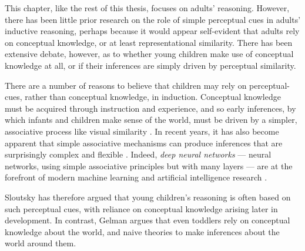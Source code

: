 This chapter, like the rest of this thesis, focuses on adults' reasoning.
However, there has been little prior research on the role of
simple perceptual cues in adults' inductive reasoning,
perhaps because it would appear self-evident that
adults rely on conceptual knowledge,
or at least representational similarity.
There has been extensive debate, however,
as to whether young children make use of conceptual knowledge at all,
or if their inferences are simply driven by perceptual similarity.

There are a number of reasons to believe that children may rely on perceptual-cues,
rather than conceptual knowledge, in induction.
Conceptual knowledge must be acquired through instruction and experience,
and so early inferences, by which infants and children make sense of the world,
must be driven by a simpler, associative process like visual similarity
\citep{Westermann2013,French2004}.
In recent years, it has also become apparent that
simple associative mechanisms can produce
inferences that are surprisingly complex and flexible \citep{Sloutsky2008,Hinton2014}.
Indeed, \emph{deep neural networks} ---
neural networks, using simple associative principles but with many layers ---
are at the forefront of modern machine learning and artificial intelligence research
\citep{Mnih2013,Hinton2006}.

Sloutsky \citep[i.e.][see \citealp{Sloutsky2003,Sloutsky2010} for reviews]{
  Sloutsky2008,Sloutsky2007,Sloutsky2004a}
has therefore argued that young children's reasoning
is often based on such perceptual cues,
with reliance on conceptual knowledge arising later in development.
In contrast, Gelman 
\citep[i.e.][see \citealp{Gelman2011a,Gelman2004a} for reviews]{
  Gelman2013c,Rhodes2009,Gelman2007a,Gelman1986}
argues that even toddlers
rely on conceptual knowledge about the world,
and naive theories \citep{Gopnik2003,Carey2009} 
to make inferences about the world around them.

